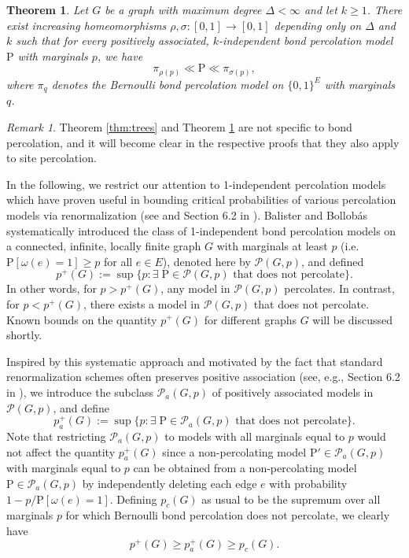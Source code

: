 \documentclass[11pt]{article}
\renewcommand{\P}{\mathrm{P}}
\newtheorem{theorem}{Theorem}
\theoremstyle{remark}
\newtheorem{remark}{Remark}
\begin{document}
\begin{theorem} \label{thm:stochastic-domination}
	Let $G$ be a graph with maximum degree $\Delta < \infty$ and let $k\ge 1$. There exist increasing homeomorphisms $\rho,\sigma : [0,1] \to [0,1]$ depending only on $\Delta$ and $k$ such that for every positively associated, $k$-independent bond percolation model $\P$ with marginals $p$, we have
	\begin{equation*}
		\pi_{\rho(p)} \ll \P \ll \pi_{\sigma(p)},
	\end{equation*}
	where $\pi_q$ denotes the Bernoulli bond percolation model on $\{0,1\}^E$ with marginals $q$.
\end{theorem}

\begin{remark}
	Theorem \ref{thm:trees} and Theorem \ref{thm:stochastic-domination} are not specific to bond percolation, and it will become clear in the respective proofs that they also apply to site percolation.
\end{remark}

In the following, we restrict our attention to 1-independent percolation models which have proven useful in bounding critical probabilities of various percolation models via renormalization (see \cite{Balister2005} and Section 6.2 in \cite{bollobas2006percolation}). Balister and Bollobás \cite{Balister2012} systematically introduced the class of 1-independent bond percolation models on a connected, infinite, locally finite graph $G$ with marginals at least $p$ (i.e.\ $\P[\omega(e)=1]\ge p$ for all $e \in E$), denoted here by $\mathcal{P}(G,p)$, and defined 
\begin{equation}
	p^{+}(G) := \sup\{p : \exists\; \P \in \mathcal{P}(G,p) \text{ that does not percolate}\}. 
\end{equation}
In other words, for  $p > p^{+}(G)$, any model in $\mathcal{P}(G,p)$ percolates. In contrast, for $p < p^{+}(G)$, there exists a model in $\mathcal{P}(G,p)$ that does not percolate. Known bounds on the quantity $p^{+}(G)$ for different graphs $G$ will be discussed shortly. 

Inspired by this systematic approach and motivated by the fact that standard renormalization schemes often preserves positive association (see, e.g., Section 6.2 in \cite{bollobas2006percolation}), we introduce the subclass $\mathcal{P}_{a}(G,p)$ of positively associated models in $\mathcal{P}(G,p)$, and define
\begin{equation}
	p_a^{+}(G) := \sup\{p : \exists\; \P \in \mathcal{P}_a(G,p) \text{ that does not percolate}\}. 
\end{equation}
Note that restricting $\mathcal{P}_{a}(G,p)$  to models with all marginals equal to $p$ would not affect the quantity $p_a^{+}(G)$ since a non-percolating model $\P' \in \mathcal{P}_a(G,p)$ with marginals equal to $p$ can be obtained from a non-percolating model $\P \in \mathcal{P}_a(G,p)$  by independently deleting each edge $e$ with probability $1 - p/\P[\omega(e)=1]$.
Defining $p_c(G)$ as usual to be the supremum over all marginals $p$ for which Bernoulli bond percolation does not percolate, we clearly have 
\begin{equation}
    p^+(G) \ge  p_a^+(G) \ge p_c(G).
\end{equation} 
\end{document}
